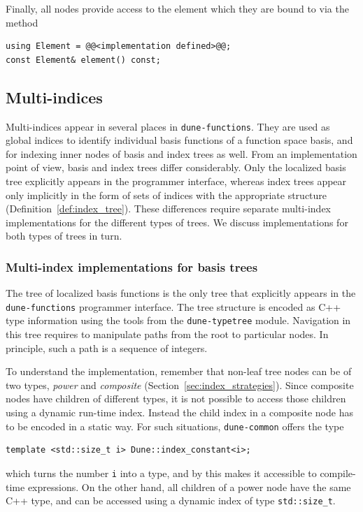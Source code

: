 \documentclass[a4paper,10pt,headings=normal,bibliography=totoc]{scrartcl}
\newcommand{\cpp}[1]{\lstinline[basicstyle=\ttfamily]!#1!}
\newcommand{\dunemodule}[1]{\texttt{#1}}
\begin{document}
Finally, all nodes provide access to the
element which they are bound
to via the method
\begin{lstlisting}[style=Interface]
using Element = @@<implementation defined>@@;
const Element& element() const;
\end{lstlisting}



\subsection{Multi-indices}
\label{sec:multi_indices}
Multi-indices appear in several places in \dunemodule{dune-functions}.
They are used as global indices to identify individual
basis functions of a function space basis, and for indexing
inner nodes of basis and index trees as well.
From an implementation point of view, basis and index trees differ
considerably. Only the localized basis tree explicitly appears
in the programmer interface, whereas index trees appear only implicitly
in the form of sets of indices with the appropriate structure (Definition~\ref{def:index_tree}).
These differences require separate multi-index
implementations for the different types of trees.  We discuss implementations
for both types of trees in turn.

\subsubsection{Multi-index implementations for basis trees}

The tree of localized basis functions is the only tree that explicitly appears
in the \dunemodule{dune-functions} programmer interface. The tree structure
is encoded as C++ type information using the tools from the \dunemodule{dune-typetree}
module. Navigation in this tree requires to manipulate paths from the root to
particular nodes.  In principle, such a path is a sequence of integers.

To understand the implementation,
remember that non-leaf tree nodes can be of two types, \emph{power} and
\emph{composite} (Section~\ref{sec:index_strategies}).
Since composite nodes have children of different
types, it is not possible to access those children using a dynamic run-time
index. Instead the child index in a composite node has to be encoded in a static
way.  For such situations, \dunemodule{dune-common} offers the type
\begin{lstlisting}[style=Interface]
template <std::size_t i> Dune::index_constant<i>;
\end{lstlisting}
which turns the number \cpp{i} into a type, and by this makes it accessible
to compile-time expressions.
On the other hand, all children of a power node have
the same C++ type, and can be accessed using a dynamic index of type \cpp{std::size_t}.
\end{document}
